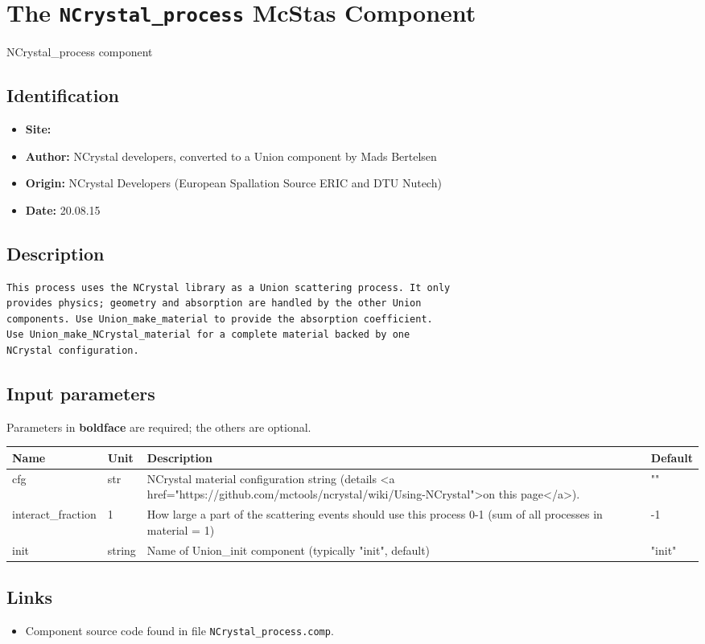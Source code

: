 \section{The \texttt{NCrystal\_process} McStas Component}
NCrystal\_process component

\subsection*{Identification}
\begin{itemize}
  \item \textbf{Site:} 
  \item \textbf{Author:} NCrystal developers, converted to a Union component by Mads Bertelsen
  \item \textbf{Origin:} NCrystal Developers (European Spallation Source ERIC and DTU Nutech)
  \item \textbf{Date:} 20.08.15
\end{itemize}

\subsection*{Description}
\begin{lstlisting}
This process uses the NCrystal library as a Union scattering process. It only
provides physics; geometry and absorption are handled by the other Union
components. Use Union_make_material to provide the absorption coefficient.
Use Union_make_NCrystal_material for a complete material backed by one
NCrystal configuration.
\end{lstlisting}

\subsection*{Input parameters}
Parameters in \textbf{boldface} are required; the others are optional.

\begin{longtable}{p{}p{}p{}p{}}
\toprule
\textbf{Name} & \textbf{Unit} & \textbf{Description} & \textbf{Default} \\
\midrule
\endhead
cfg & str & NCrystal material configuration string (details \textless{}a href="https://github.com/mctools/ncrystal/wiki/Using-NCrystal"\textgreater{}on this page\textless{}/a\textgreater{}). & "" \\
interact\_fraction & 1 & How large a part of the scattering events should use this process 0-1 (sum of all processes in material = 1) & -1 \\
init & string & Name of Union\_init component (typically "init", default) & "init" \\
\bottomrule
\end{longtable}

\subsection*{Links}
\begin{itemize}
  \item Component source code found in file \texttt{NCrystal\_process.comp}.
\end{itemize}
